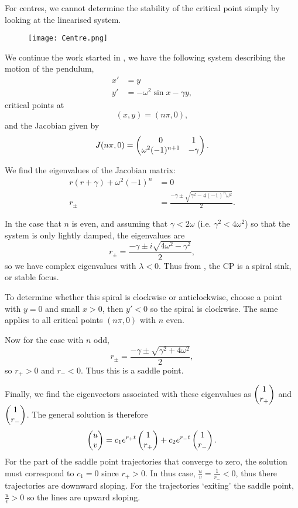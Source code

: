 \begin{remark}
	For centres, we cannot determine the stability of the critical point simply by looking at the linearised system.
\end{remark}

\begin{figure}[!ht]
	\centering
	\texttt{[image: Centre.png]}
	\label{fig:centrepiracy}
\end{figure}

\begin{eg}\label{eg:dampedpendulum2}
	We continue the work started in , we have the following system describing the motion of the pendulum, 
	\begin{align*}
		x' &= y \\
		y' &= -\omega^2 \sin{x} - \gamma y,
	\end{align*}
	critical points at
	\[
	(x,y) = (n\pi, 0),
	\]
	and the Jacobian given by
	\[
	J(n\pi,0) = \begin{pmatrix}0 & 1 \\ \omega^2 (-1)^{n+1} & -\gamma\end{pmatrix}.
	\]
	
	We find the eigenvalues of the Jacobian matrix:
	\begin{align*}
		r(r+\gamma) + \omega^2 (-1)^n &= 0 \\
		r_{\pm} &= \frac{-\gamma \pm \sqrt{\gamma^2 - 4(-1)^n\omega^2}}{2}.
	\end{align*}
	
	In the case that $n$ is even, and assuming that $\gamma < 2\omega$ (i.e. $\gamma^2 < 4\omega^2$) so that the system is only lightly damped, the eigenvalues are
	\[
	r_{\pm} = \frac{-\gamma \pm i\sqrt{4\omega^2 - \gamma^2}}{2},
	\]
	so we have complex eigenvalues with $\lambda<0$. Thus from , the CP is a spiral sink, or stable focus.
	
	To determine whether this spiral is clockwise or anticlockwise, choose a point with $y=0$ and small $x>0$, then $y'<0$ so the spiral is clockwise. The same applies to all critical points $(n\pi, 0)$ with $n$ even.
	
	Now for the case with $n$ odd,
	\[
	r_{\pm} = \frac{-\gamma \pm \sqrt{\gamma^2 + 4\omega^2}}{2},
	\]
	so $r_+>0$ and $r_-<0$. Thus this is a saddle point.
	
	Finally, we find the eigenvectors associated with these eigenvalues as $\begin{pmatrix}1\\r_+\end{pmatrix}$ and $\begin{pmatrix}1\\r_-\end{pmatrix}$. The general solution is therefore
	\[
	\begin{pmatrix}u\\v\end{pmatrix} = c_1e^{r_+t}\begin{pmatrix}1\\r_+\end{pmatrix} + c_2e^{r_-t}\begin{pmatrix}1\\r_-\end{pmatrix}.
	\]
	For the part of the saddle point trajectories that converge to zero, the solution must correspond to $c_1=0$ since $r_+>0$. In thus case, $\frac{u}{v} = \frac{1}{r_-} < 0$, thus there trajectories are downward sloping. For the trajectories `exiting' the saddle point, $\frac{u}{v} > 0$ so the lines are upward sloping.
	

\end{eg}
